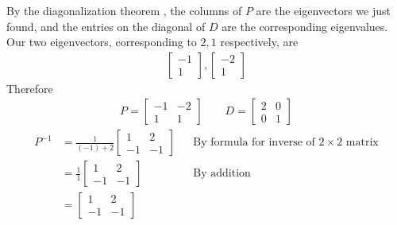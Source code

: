 \documentclass[10pt,letterpaper,final]{report}
\newcommand{\reason}[1]{&& \text{#1}}
\begin{document}
\begin{enumerate}[label=(\alph*)]
        By the diagonalization theorem \cite[Theorem~5.5, p.~291]{LayEtAl2020LinearAlgebraAndItsApplications}, the columns of $P$ are the eigenvectors we just found, and the entries on the diagonal of $D$ are the corresponding eigenvalues. Our two eigenvectors, corresponding to $2, 1$ respectively, are
        \begin{align*}
          \begin{bmatrix}
            -1 \\
            1
          \end{bmatrix}, \begin{bmatrix}
                           -2 \\
                           1
                         \end{bmatrix}
        \end{align*}
        Therefore
        \begin{align*}
          P = \begin{bmatrix}
                -1 & -2 \\
                1  & 1
              \end{bmatrix} \qquad D = \begin{bmatrix}
                                         2 & 0 \\
                                         0 & 1
                                       \end{bmatrix}
        \end{align*}
        \begin{align*}
          P^{-1} & = \frac{1}{(-1) + 2}\begin{bmatrix}
                                         1  & 2  \\
                                         -1 & -1
                                       \end{bmatrix} \reason{By formula for inverse of $2 \times 2$ matrix} \\[1ex]
                 & = \frac{1}{1}\begin{bmatrix}
                                  1  & 2  \\
                                  -1 & -1
                                \end{bmatrix} \reason{By addition}                                          \\[1ex]
                 & = \begin{bmatrix}
                       1  & 2  \\
                       -1 & -1

\end{bmatrix}
\end{align*}
\end{enumerate}
\end{document}
